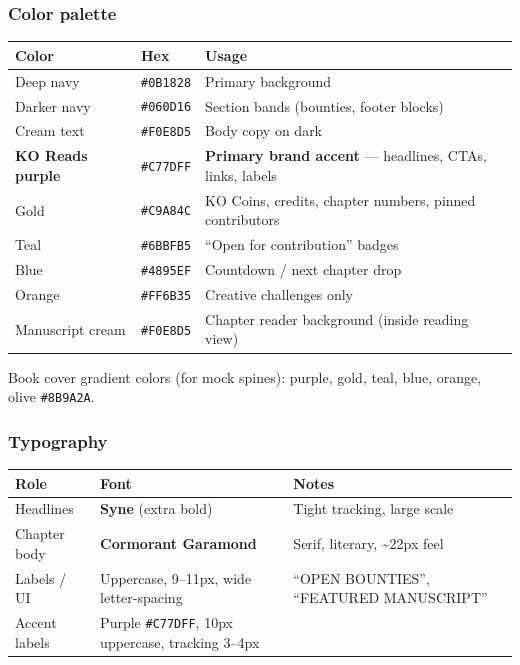 \documentclass[11pt,a4paper]{report}
\begin{document}
\subsubsection{Color palette}

\begin{longtable}{|l|l|l|}
\hline
Color & Hex & Usage \\ \hline
Deep navy & \texttt{\#0B1828} & Primary background \\ \hline
Darker navy & \texttt{\#060D16} & Section bands (bounties, footer blocks) \\ \hline
Cream text & \texttt{\#F0E8D5} & Body copy on dark \\ \hline
\textbf{KO Reads purple} & \texttt{\#C77DFF} & \textbf{Primary brand accent} --- headlines, CTAs, links, labels \\ \hline
Gold & \texttt{\#C9A84C} & KO Coins, credits, chapter numbers, pinned contributors \\ \hline
Teal & \texttt{\#6BBFB5} & “Open for contribution” badges \\ \hline
Blue & \texttt{\#4895EF} & Countdown / next chapter drop \\ \hline
Orange & \texttt{\#FF6B35} & Creative challenges only \\ \hline
Manuscript cream & \texttt{\#F0E8D5} & Chapter reader background (inside reading view) \\
\hline
\end{longtable}


Book cover gradient colors (for mock spines): purple, gold, teal, blue, orange, olive \texttt{\#8B9A2A}.


\subsubsection{Typography}

\begin{longtable}{|l|l|l|}
\hline
Role & Font & Notes \\ \hline
Headlines & \textbf{Syne} (extra bold) & Tight tracking, large scale \\ \hline
Chapter body & \textbf{Cormorant Garamond} & Serif, literary, \textasciitilde{}22px feel \\ \hline
Labels / UI & Uppercase, 9--11px, wide letter-spacing & “OPEN BOUNTIES”, “FEATURED MANUSCRIPT” \\ \hline
Accent labels & Purple \texttt{\#C77DFF}, 10px uppercase, tracking 3--4px \\
\hline
\end{longtable}
\end{document}
